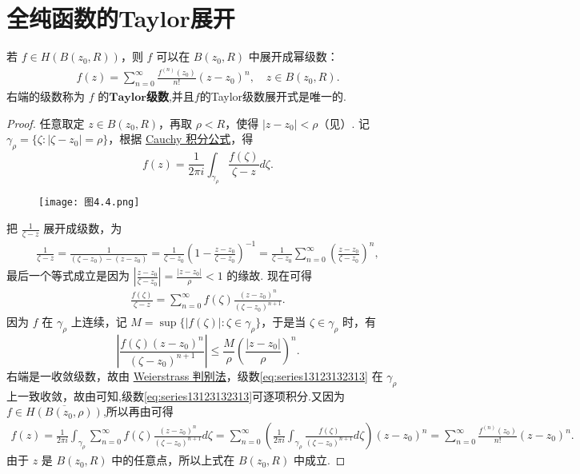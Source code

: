 \documentclass[../../main.tex]{subfiles}
\begin{document}
\section{全纯函数的Taylor展开}

\begin{theorem}\label{theorem:定理4.3.1}
若 \( f \in H(B(z_0,R)) \)，则 \( f \) 可以在 \( B(z_0,R) \) 中展开成幂级数：
\begin{align}
f(z) = \sum_{n=0}^{\infty} \frac{f^{(n)}(z_0)}{n!} (z - z_0)^n, \quad z \in B(z_0,R). \label{eq:taylor312412342}
\end{align}
右端的级数称为 \( f \) 的$\mathbf{Taylor}$\textbf{级数},并且$f$的Taylor级数展开式是唯一的.
\end{theorem}
\begin{proof}
任意取定 \( z \in B(z_0,R) \)，再取 \( \rho < R \)，使得 \( |z - z_0| < \rho \)（见）. 记 \( \gamma_{\rho} = \{ \zeta : |\zeta - z_0| = \rho \} \)，根据 \hyperref[theorem:定理3.4.1]{Cauchy 积分公式}，得
\[
f(z) = \frac{1}{2\pi i} \int_{\gamma_{\rho}} \frac{f(\zeta)}{\zeta - z} d\zeta.
\]
\begin{figure}[H]
\centering
\texttt{[image: 图4.4.png]}
\caption{}
\label{figure:图4.4}
\end{figure}
把 \( \frac{1}{\zeta - z} \) 展开成级数，为
\begin{align*}
\frac{1}{\zeta - z} = \frac{1}{(\zeta - z_0) - (z - z_0)} = \frac{1}{\zeta - z_0} \left( 1 - \frac{z - z_0}{\zeta - z_0} \right)^{-1} = \frac{1}{\zeta - z_0} \sum_{n=0}^{\infty} \left( \frac{z - z_0}{\zeta - z_0} \right)^n,
\end{align*}
最后一个等式成立是因为 \( \left| \frac{z - z_0}{\zeta - z_0} \right| = \frac{|z - z_0|}{\rho} < 1 \) 的缘故. 现在可得
\begin{align}
\frac{f(\zeta)}{\zeta - z} = \sum_{n=0}^{\infty} f(\zeta) \frac{(z - z_0)^n}{(\zeta - z_0)^{n+1}}. \label{eq:series13123132313}
\end{align}
因为 \( f \) 在 \( \gamma_{\rho} \) 上连续，记 \( M = \sup \{ |f(\zeta)| : \zeta \in \gamma_{\rho} \} \)，于是当 \( \zeta \in \gamma_{\rho} \) 时，有
\[
\left| \frac{f(\zeta)(z - z_0)^n}{(\zeta - z_0)^{n+1}} \right| \leqslant  \frac{M}{\rho} \left( \frac{|z - z_0|}{\rho} \right)^n.
\]
右端是一收敛级数，故由 \hyperref[theorem:Weierstrass一致收敛判别法]{Weierstrass 判别法}，级数\eqref{eq:series13123132313} 在 \( \gamma_{\rho} \) 上一致收敛，故由可知,级数\eqref{eq:series13123132313}可逐项积分.又因为$f\in \overline{H(B(z_0,\rho))}$,所以再由可得
\begin{align*}
f(z) = \frac{1}{2\pi i} \int_{\gamma_{\rho}} \sum_{n=0}^{\infty} f(\zeta) \frac{(z - z_0)^n}{(\zeta - z_0)^{n+1}} d\zeta = \sum_{n=0}^{\infty} \left( \frac{1}{2\pi i} \int_{\gamma_{\rho}} \frac{f(\zeta)}{(\zeta - z_0)^{n+1}} d\zeta \right) (z - z_0)^n = \sum_{n=0}^{\infty} \frac{f^{(n)}(z_0)}{n!} (z - z_0)^n.
\end{align*}
由于 \( z \) 是 \( B(z_0,R) \) 中的任意点，所以上式在 \( B(z_0,R) \) 中成立. 


\end{proof}
\end{document}
